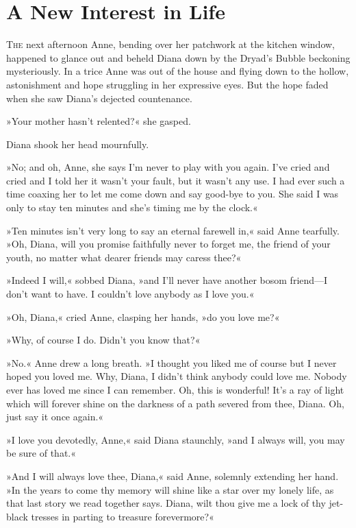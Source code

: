 \chapter{A New Interest in Life}

\lettrine[lines=4]{T}{he} next afternoon Anne, bending over her patchwork at the kitchen window, happened to glance out and beheld Diana down by the Dryad's Bubble beckoning mysteriously. In a trice Anne was out of the house and flying down to the hollow, astonishment and hope struggling in her expressive eyes. But the hope faded when she saw Diana's dejected countenance.

»Your mother hasn't relented?« she gasped.

Diana shook her head mournfully.

»No; and oh, Anne, she says I'm never to play with you again. I've cried and cried and I told her it wasn't your fault, but it wasn't any use. I had ever such a time coaxing her to let me come down and say good-bye to you. She said I was only to stay ten minutes and she's timing me by the clock.«

»Ten minutes isn't very long to say an eternal farewell in,« said Anne tearfully. »Oh, Diana, will you promise faithfully never to forget me, the friend of your youth, no matter what dearer friends may caress thee?«

»Indeed I will,« sobbed Diana, »and I'll never have another bosom friend—I don't want to have. I couldn't love anybody as I love you.«

»Oh, Diana,« cried Anne, clasping her hands, »do you love me?«

»Why, of course I do. Didn't you know that?«

»No.« Anne drew a long breath. »I thought you liked me of course but I never hoped you loved me. Why, Diana, I didn't think anybody could love me. Nobody ever has loved me since I can remember. Oh, this is wonderful! It's a ray of light which will forever shine on the darkness of a path severed from thee, Diana. Oh, just say it once again.«

»I love you devotedly, Anne,« said Diana staunchly, »and I always will, you may be sure of that.«

»And I will always love thee, Diana,« said Anne, solemnly extending her hand. »In the years to come thy memory will shine like a star over my lonely life, as that last story we read together says. Diana, wilt thou give me a lock of thy jet-black tresses in parting to treasure forevermore?«

